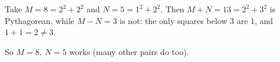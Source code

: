 Take $M=8=2^2+2^2$ and $N=5=1^2+2^2$. Then $M+N=13=2^2+3^2$ is Pythagorean, while $M-N=3$ is not: the only squares below $3$ are $1$, and $1+1=2\ne3$.

So $\boxed{M=8,\ N=5}$ works (many other pairs do too).

